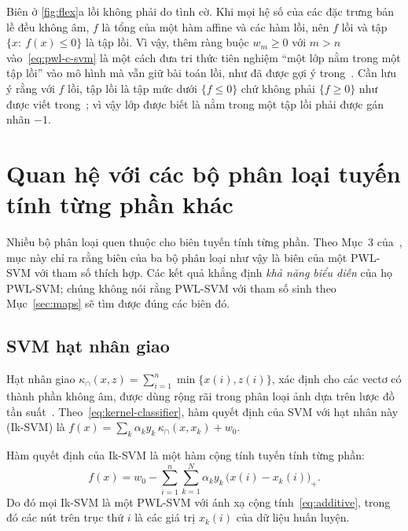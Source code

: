 \begin{remark}\label{rem:convex}
Biên ở \cref{fig:flex}a lồi không phải do tình cờ. Khi mọi hệ số của các đặc trưng bản lề đều không âm, $f$ là tổng của một hàm affine và các hàm lồi, nên $f$ lồi và tập $\{x:\ f(x)\le0\}$ là tập lồi. Vì vậy, thêm ràng buộc $w_m\ge0$ với $m>n$ vào~\eqref{eq:pwl-c-svm} là một cách đưa tri thức tiên nghiệm “một lớp nằm trong một tập lồi” vào mô hình mà vẫn giữ bài toán lồi, như đã được gợi ý trong~\cite[Mục~5]{huang2013}. Cần lưu ý rằng với $f$ lồi, tập lồi là tập mức dưới $\{f\le0\}$ chứ không phải $\{f\ge0\}$ như được viết trong~\cite{huang2013}; vì vậy lớp được biết là nằm trong một tập lồi phải được gán nhãn $-1$.
\end{remark}

\section{Quan hệ với các bộ phân loại tuyến tính từng phần khác}\label{sec:relations}

Nhiều bộ phân loại quen thuộc cho biên tuyến tính từng phần. Theo Mục~3 của~\cite{huang2013}, mục này chỉ ra rằng biên của ba bộ phân loại như vậy là biên của một PWL-SVM với tham số thích hợp. Các kết quả khẳng định \emph{khả năng biểu diễn} của họ PWL-SVM; chúng không nói rằng PWL-SVM với tham số sinh theo Mục~\ref{sec:maps} sẽ tìm được đúng các biên đó.

\subsection{SVM hạt nhân giao}

Hạt nhân giao $\kappa_\cap(x,z)=\sum_{i=1}^{n}\min\{x(i),z(i)\}$, xác định cho các vectơ có thành phần không âm, được dùng rộng rãi trong phân loại ảnh dựa trên lược đồ tần suất~\cite{maji2008}. Theo~\eqref{eq:kernel-classifier}, hàm quyết định của SVM với hạt nhân này (Ik-SVM) là $f(x)=\sum_k\alpha_ky_k\,\kappa_\cap(x,x_k)+w_0$.

\begin{proposition}\label{prop:iksvm}
Hàm quyết định của Ik-SVM là một hàm cộng tính tuyến tính từng phần:
\begin{equation}\label{eq:iksvm}
f(x)=w_0-\sum_{i=1}^{n}\sum_{k=1}^{N}\alpha_ky_k\,\bigl(x(i)-x_k(i)\bigr)_+ .
\end{equation}
Do đó mọi Ik-SVM là một PWL-SVM với ánh xạ cộng tính~\eqref{eq:additive}, trong đó các nút trên trục thứ $i$ là các giá trị $x_k(i)$ của dữ liệu huấn luyện.
\end{proposition}

